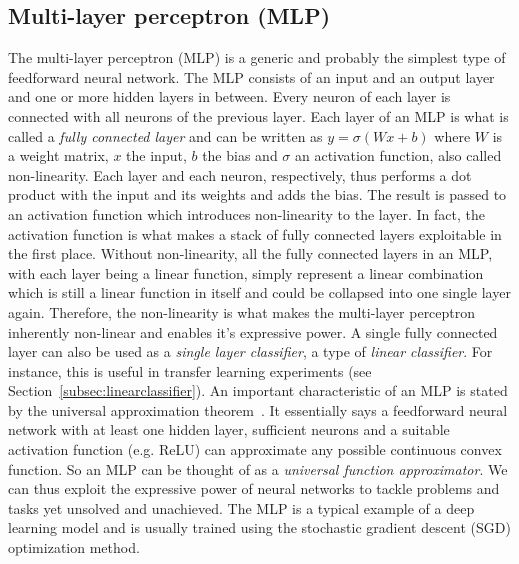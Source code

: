 \documentclass[12pt,a4paper]{article}
\begin{document}
\subsection{Multi-layer perceptron (MLP)}\label{subsec:mlp}
The multi-layer perceptron (MLP) is a generic and probably the simplest type of feedforward neural network. The MLP consists of an input and an output layer and one or more hidden layers in between. Every neuron of each layer is connected with all neurons of the previous layer. Each layer of an MLP is what is called a \textit{fully connected layer} and can be written as $y = \sigma (Wx + b)$ where $W$ is a weight matrix, $x$ the input, $b$ the bias and $\sigma$ an activation function, also called non-linearity. Each layer and each neuron, respectively, thus performs a dot product with the input and its weights and adds the bias. The result is passed to an activation function which introduces non-linearity to the layer. In fact, the activation function is what makes a stack of fully connected layers exploitable in the first place. Without non-linearity, all the fully connected layers in an MLP, with each layer being a linear function, simply represent a linear combination which is still a linear function in itself and could be collapsed into one single layer again. Therefore, the non-linearity is what makes the multi-layer perceptron inherently non-linear and enables it's expressive power. A single fully connected layer can also be used as a \textit{single layer classifier}, a type of \textit{linear classifier}. For instance, this is useful in transfer learning experiments (see Section~\ref{subsec:linearclassifier}). An important characteristic of an MLP is stated by the universal approximation theorem~\cite{mlpUnivApprox}. It essentially says a feedforward neural network with at least one hidden layer, sufficient neurons and a suitable activation function (e.g. ReLU) can approximate any possible continuous convex function. So an MLP can be thought of as a \textit{universal function approximator}. We can thus exploit the expressive power of neural networks to tackle problems and tasks yet unsolved and unachieved. The MLP is a typical example of a deep learning model and is usually trained using the stochastic gradient descent (SGD) optimization method.

\end{document}
